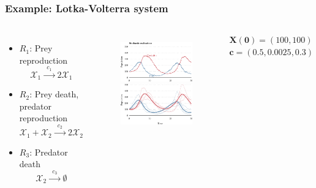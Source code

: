 \documentclass[t,compress]{beamer}
\begin{document}
\begin{frame}
\frametitle{Example: Lotka-Volterra system}
\begin{columns}[c]
\begin{itemize}
\item $R_1$: Prey reproduction
\[
 \mathcal{X}_{1}\xrightarrow{\phantom{a}c_{1}\phantom{a}}  2\mathcal{X}_{1}
\]
\item $R_2$: Prey death, predator reproduction
\[
  \mathcal{X}_{1}+\mathcal{X}_{2}\xrightarrow{\phantom{a}c_{2}\phantom{a}}
  2\mathcal{X}_{2} 
\]
\item $R_3$: Predator death
\[
   \mathcal{X}_{2}\xrightarrow{\phantom{a}c_{3}\phantom{a}}  \emptyset 
\]
\end{itemize}


\begin{figure}
\centering
\includegraphics[width=\textwidth]{figure1a-crop}\\
\includegraphics[width=\textwidth]{figure1b-crop}
\end{figure}
$\mathbf{X(0)} = (100, 100)$\\  $\mathbf{c} = (0.5, 0.0025, 0.3)$
\end{columns}
\end{frame}
\end{document}
